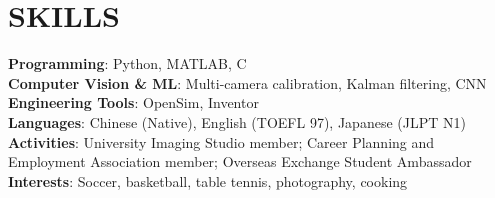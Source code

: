 \documentclass[11pt,a4paper]{article}
\newcommand{\cvitem}[2]{\textbf{#1}: #2}
\begin{document}
\section*{SKILLS}

\cvitem{Programming}{Python, MATLAB, C}\\
\cvitem{Computer Vision \& ML}{Multi-camera calibration, Kalman filtering, CNN}\\
\cvitem{Engineering Tools}{OpenSim, Inventor}\\
\cvitem{Languages}{Chinese (Native), English (TOEFL 97), Japanese (JLPT N1)}\\
\cvitem{Activities}{University Imaging Studio member; Career Planning and Employment Association member; Overseas Exchange Student Ambassador}\\
\cvitem{Interests}{Soccer, basketball, table tennis, photography, cooking}
\end{document}
